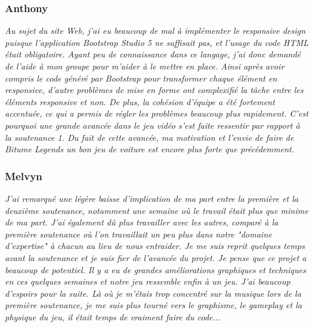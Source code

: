\documentclass[a4paper,12pt]{article}
\begin{document}
         \subsubsection{Anthony}
                \textit{Au sujet du site Web, j'ai eu beaucoup de mal à implémenter le responsive design
                puisque l'application Bootstrap Studio 5 ne suffisait pas, et l'usage du code HTML était
                obligatoire. Ayant peu de connaissance dans ce langage, j'ai donc demandé
                de l'aide à mon groupe pour m'aider à le mettre en place. Ainsi après avoir compris le
                code généré par Bootstrap pour transformer chaque élément en responsive, d'autre
                problèmes de mise en forme ont complexifié la tâche entre les éléments responsive et
                non. De plus, la cohésion d'équipe a été fortement accentuée, ce qui a permis de régler 
                les problèmes beaucoup plus rapidement. C'est pourquoi une grande avancée dans le 
                jeu vidéo s'est faite ressentir par rapport à la soutenance 1. Du fait de cette avancée, 
                ma motivation et l'envie de faire de Bitume Legends un bon jeu de voiture est encore 
                plus forte que précédemment.}

            \subsubsection{Melvyn}
                \textit{J'ai remarqué une légère baisse d'implication de ma part entre la 
                première et la deuxième soutenance, notamment une semaine où le 
                travail était plus que minime de ma part. J'ai également dû plus 
                travailler avec les autres, comparé à la première soutenance où l'on
                travaillait un peu plus dans notre "domaine d'expertise" à chacun 
                au lieu de nous entraider. Je me suis reprit quelques temps avant la
                soutenance et je suis fier de l'avancée du projet. Je pense que ce projet
                a beaucoup de potentiel. Il y a eu de grandes améliorations graphiques et
                techniques en ces quelques semaines et notre jeu ressemble enfin à un jeu.
                J'ai beaucoup d'espoirs pour la suite. Là où je m'étais trop concentré sur
                la musique lors de la première soutenance, je me suis plus tourné vers
                le graphisme, le gameplay et la physique du jeu, il était temps de vraiment
                faire du code...}
\end{document}
